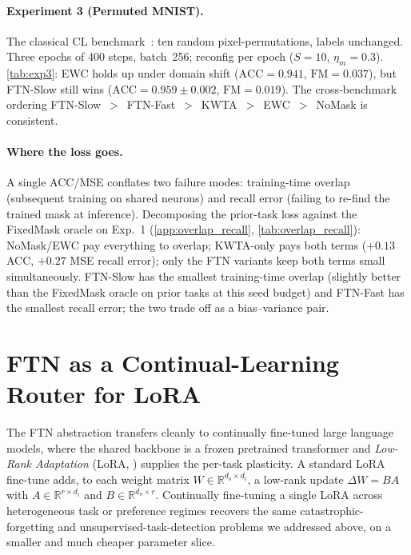 \documentclass{article}
\theoremstyle{plain}
\theoremstyle{remark}
\begin{document}


\paragraph{Experiment 3 (Permuted MNIST).}
The classical CL benchmark~\citep{goodfellow2013empirical,kirkpatrick2017overcoming,van2019three}: ten random pixel-permutations, labels unchanged. Three epochs of 400 steps, batch~256; reconfig per epoch ($S{=}10$, $\eta_m{=}0.3$). \cref{tab:exp3}: EWC holds up under domain shift ($\mathrm{ACC}=0.941$, $\mathrm{FM}=0.037$), but FTN-Slow still wins ($\mathrm{ACC}=0.959\pm 0.002$, $\mathrm{FM}=0.019$). The cross-benchmark ordering FTN-Slow~$>$~FTN-Fast~$>$~KWTA~$>$~EWC~$>$~NoMask is consistent.



\paragraph{Where the loss goes.}
A single ACC/MSE conflates two failure modes: training-time overlap (subsequent training on shared neurons) and recall error (failing to re-find the trained mask at inference). Decomposing the prior-task loss against the FixedMask oracle on Exp.~1 (\cref{app:overlap_recall}, \cref{tab:overlap_recall}): NoMask/EWC pay everything to overlap; KWTA-only pays both terms ($+0.13$ ACC, $+0.27$ MSE recall error); only the FTN variants keep both terms small simultaneously. FTN-Slow has the smallest training-time overlap (slightly better than the FixedMask oracle on prior tasks at this seed budget) and FTN-Fast has the smallest recall error; the two trade off as a bias--variance pair.

\section{FTN as a Continual-Learning Router for LoRA}
\label{sec:llm_lora}

The FTN abstraction transfers cleanly to continually fine-tuned large language models, where the shared backbone is a frozen pretrained transformer and \emph{Low-Rank Adaptation} (LoRA, \citealt{hu2022lora}) supplies the per-task plasticity. A standard LoRA fine-tune adds, to each weight matrix $W\in\mathbb{R}^{d_o\times d_i}$, a low-rank update $\Delta W=BA$ with $A\in\mathbb{R}^{r\times d_i}$ and $B\in\mathbb{R}^{d_o\times r}$. Continually fine-tuning a single LoRA across heterogeneous task or preference regimes recovers the same catastrophic-forgetting and unsupervised-task-detection problems we addressed above, on a smaller and much cheaper parameter slice.
\end{document}
